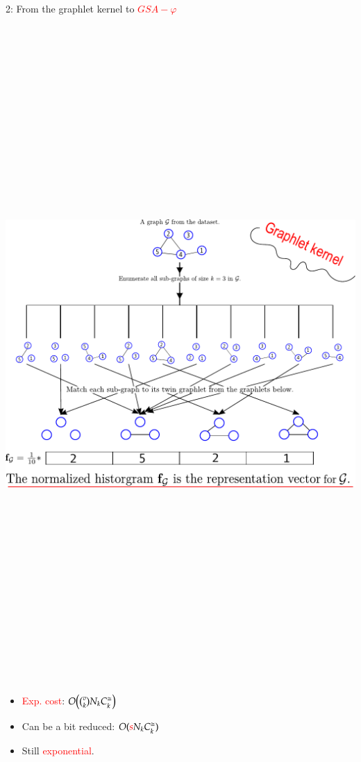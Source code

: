 \documentclass[final,dvipsnames]{beamer}
\newcommand{\vsp}{\vspace{10pt}}
\newcommand{\myemph}[1]{\textcolor{red}{#1}}
\begin{document}
\begin{frame}{}
\begin{columns}[t]
\begin{column}{0.45\linewidth}
\begin{block}{2: From the graphlet kernel to \myemph{$GSA-\varphi$}}
\begin{minipage}{.99\linewidth}
		\begin{mynotablock}
			\vsp
			\parbox{0.4\textwidth}{
				\includegraphics[height=25cm]{figs/gk.pdf}
			}
			\hfill
			\parbox{0.35\textwidth}{
				\large
				\begin{itemize}
					\item  \myemph{Exp. cost}:  $O\big(\tbinom{v}{k} N_k C^{\cong}_k\big)$
					\vsp
					\item Can be a bit reduced: $O(\textcolor{red}{s}N_k C^{\cong}_k)$
					\vsp
					\item Still \myemph{exponential}.
				\end{itemize}
			}
		

\end{mynotablock}
\end{minipage}
\end{block}
\end{column}
\end{columns}
\end{frame}
\end{document}
